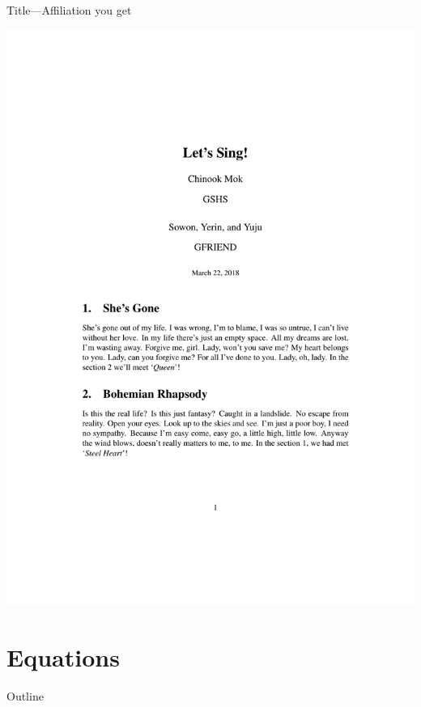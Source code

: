 \documentclass[12pt]{gshs_lecture}
\begin{document}
\begin{frame}[t]{Title---Affiliation}\small
you get
\begin{center}
\begin{framed}
\includegraphics[width=\textwidth,trim={0cm 13cm 0cm 4cm},clip]{./test_article/article008.pdf}
\end{framed}
\end{center}
\end{frame}

\section{Equations} %

\begin{frame}[t]{Outline}
\tableofcontents[currentsection]
\end{frame}
\end{document}
